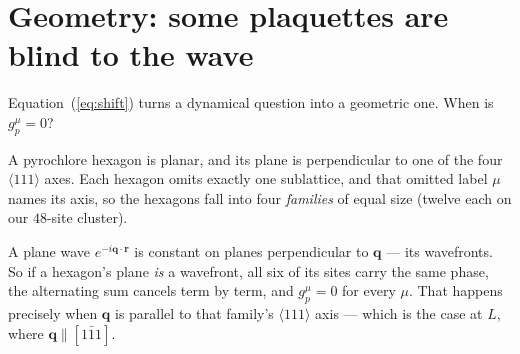 \documentclass[11pt]{article}
\newcommand{\bq}{\bm q}
\begin{document}
\section{Geometry: some plaquettes are blind to the wave}

Equation~(\ref{eq:shift}) turns a dynamical question into a geometric
one. When is $g^\mu_p=0$?

A pyrochlore hexagon is planar, and its plane is perpendicular to one of
the four $\langle111\rangle$ axes. Each hexagon omits exactly one
sublattice, and that omitted label $\mu$ names its axis, so the hexagons
fall into four \emph{families} of equal size (twelve each on our
$48$-site cluster).

A plane wave $e^{-i\bq\cdot\bm r}$ is constant on planes perpendicular
to $\bq$ --- its wavefronts. So if a hexagon's plane \emph{is} a
wavefront, all six of its sites carry the same phase, the alternating
sum cancels term by term, and $g^\mu_p=0$ for every $\mu$. That happens
precisely when $\bq$ is parallel to that family's $\langle111\rangle$
axis --- which is the case at $L$, where $\bq\parallel[1\bar11]$.
\end{document}
